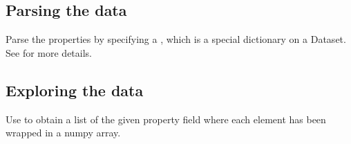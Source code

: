 \documentclass[letterpaper,10pt,english]{sphinxmanual}
\begin{document}
\begin{sphinxVerbatim}[commandchars=\\\{\}]
\end{sphinxVerbatim}


\subsection{Parsing the data}
\label{\detokenize{basic_example:parsing-the-data}}
\sphinxAtStartPar
Parse the properties by specifying a , which is a special
dictionary on a Dataset. See {\hyperref[\detokenize{usage:property-map}]{}} for more details.

\begin{sphinxVerbatim}[commandchars=\\\{\}]
  
     
            
            
\end{sphinxVerbatim}

\begin{sphinxVerbatim}[commandchars=\\\{\}]
 
\end{sphinxVerbatim}


\subsection{Exploring the data}
\label{\detokenize{basic_example:exploring-the-data}}
\sphinxAtStartPar
Use {\hyperref[\detokenize{dataset:colabfit.tools.dataset.Dataset.get_data}]{}} to obtain a list of the
given property field where each element has been wrapped in a numpy array.
\end{document}
